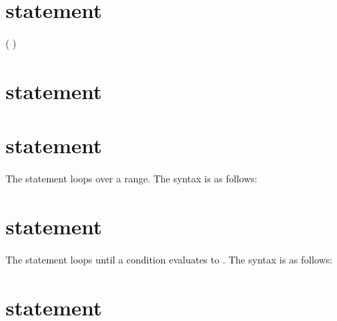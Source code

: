 \section{ statement}

\begin{grammar}
 \textrightarrow{}  \code{(}  \code{)}  ( )\optional\\
 \textrightarrow{}  \code{(}  \code{)}   
\end{grammar}

\section{ statement}

\begin{grammar}
 \textrightarrow{}   \code{;}
\end{grammar}

\section{ statement}

The  statement loops over a range. The syntax is as follows:

\begin{grammar}
 \textrightarrow{}  \code{(}     \code{)} 
\end{grammar}

\section{ statement}

The  statement loops until a condition evaluates to .
The syntax is as follows:

\begin{grammar}
 \textrightarrow{}  \code{(}  \code{)} 
\end{grammar}

\section{ statement}


